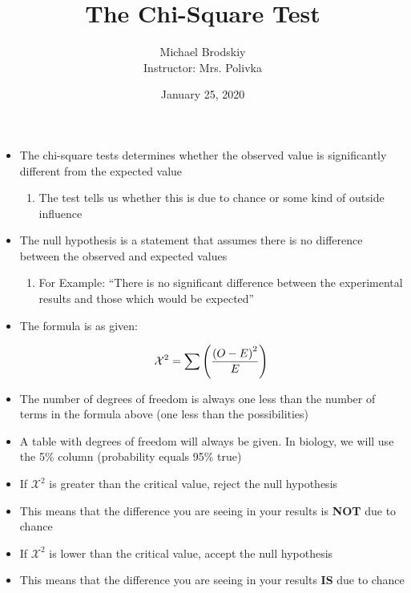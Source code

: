 \documentclass[12pt]{article}
\title{The Chi-Square Test}
\date{January 25, 2020}
\author{Michael Brodskiy\\ \small Instructor: Mrs. Polivka}
\begin{document}
\maketitle

\begin{itemize}

  \item The chi-square tests determines whether the observed value is significantly different from the expected value

    \begin{enumerate}

      \item The test tells us whether this is due to chance or some kind of outside influence

    \end{enumerate}

  \item The null hypothesis is a statement that assumes there is no difference between the observed and expected values

    \begin{enumerate}

      \item For Example: ``There is no significant difference between the experimental results and those which would be expected''

    \end{enumerate}

  \item The formula is as given:

    \begin{equation}
      \mathcal{X}^2=\sum\left( \frac{\left( O-E \right)^2}{E} \right)\\
      \label{1}
    \end{equation}

  \item The number of degrees of freedom is always one less than the number of terms in the formula above (one less than the possibilities)
    
  \item A table with degrees of freedom will always be given. In biology, we will use the 5\% column (probability equals 95\% true)

  \item If $\mathcal{X}^2$ is greater than the critical value, reject the null hypothesis

  \item This means that the difference you are seeing in your results is \textbf{NOT} due to chance

  \item If $\mathcal{X}^2$ is lower than the critical value, accept the null hypothesis

  \item This means that the difference you are seeing in your results \textbf{IS} due to chance

\end{itemize}
\end{document}

